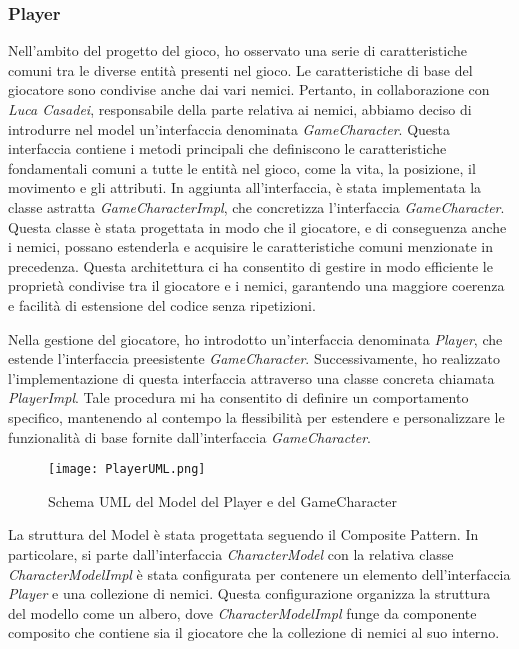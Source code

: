 \documentclass[a4paper,12pt]{report}
\begin{document}
\subsubsection{Player}
Nell'ambito del progetto del gioco, ho osservato una serie di caratteristiche comuni tra le diverse entità presenti nel gioco. Le caratteristiche di base del giocatore sono condivise anche dai vari nemici. 
Pertanto, in collaborazione con \textit{Luca Casadei}, responsabile della parte relativa ai nemici, abbiamo deciso di introdurre nel model un'interfaccia denominata \textit{GameCharacter}. Questa interfaccia contiene i metodi principali che definiscono le caratteristiche fondamentali comuni a tutte le entità nel gioco, come la vita, la posizione, il movimento e gli attributi.
In aggiunta all'interfaccia, è stata implementata la classe astratta \textit{GameCharacterImpl}, che concretizza l'interfaccia \textit{GameCharacter}. Questa classe è stata progettata in modo che il giocatore, e di conseguenza anche i nemici, possano estenderla e acquisire le caratteristiche comuni menzionate in precedenza. Questa architettura ci ha consentito di gestire in modo efficiente le proprietà condivise tra il giocatore e i nemici, garantendo una maggiore coerenza e facilità di estensione del codice senza ripetizioni.

Nella gestione del giocatore, ho introdotto un'interfaccia denominata \textit{Player}, che estende l'interfaccia preesistente \textit{GameCharacter}. Successivamente, ho realizzato l'implementazione di questa interfaccia attraverso una classe concreta chiamata \textit{PlayerImpl}. Tale procedura mi ha consentito di definire un comportamento specifico, mantenendo al contempo la flessibilità per estendere e personalizzare le funzionalità di base fornite dall'interfaccia \textit{GameCharacter}.

\begin{figure}[H]
	\centering
	\texttt{[image: PlayerUML.png]}
	\caption{Schema UML del Model del Player e del GameCharacter}
	\label{fig:diagramma-classe-player}
\end{figure}

La struttura del Model è stata progettata seguendo il Composite Pattern. In particolare, si parte dall'interfaccia \textit{CharacterModel} con la relativa classe \textit{CharacterModelImpl} è stata configurata per contenere un elemento dell'interfaccia \textit{Player} e una collezione di nemici. Questa configurazione organizza la struttura del modello come un albero, dove \textit{CharacterModelImpl} funge da componente composito che contiene sia il giocatore che la collezione di nemici al suo interno.
\end{document}
